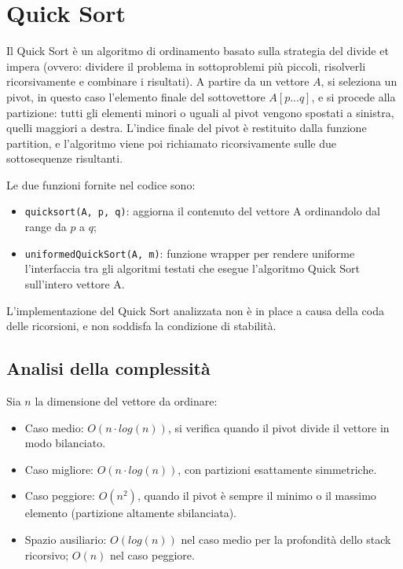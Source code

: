 \documentclass[a4paper, 12pt, oneside]{book}
\begin{document}



\chapter{Quick Sort}\label{chap:Quick Sort} %

Il Quick Sort è un algoritmo di ordinamento basato sulla strategia del divide et impera (ovvero: dividere il problema in sottoproblemi più piccoli, risolverli ricorsivamente e combinare i risultati).
A partire da un vettore \(A\), si seleziona un pivot, in questo caso l'elemento finale del sottovettore \(A[p...q]\), e si procede alla partizione: tutti gli elementi minori o uguali al pivot vengono spostati a sinistra, quelli maggiori a destra. L'indice finale del pivot è restituito dalla funzione partition, e l'algoritmo viene poi richiamato ricorsivamente sulle due sottosequenze risultanti.

\noindent Le due funzioni fornite nel codice sono:

\begin{itemize}
    \item \texttt{quicksort(A, p, q)}: aggiorna il contenuto del vettore A ordinandolo dal range da $p$ a $q$;
    \item \texttt{uniformedQuickSort(A, m)}: funzione wrapper per rendere uniforme l'interfaccia tra gli algoritmi testati che esegue l'algoritmo Quick Sort sull'intero vettore A.
\end{itemize}

\noindent
L'implementazione del Quick Sort analizzata non è in place a causa della coda delle ricorsioni, e non soddisfa la condizione di stabilità.

\section{Analisi della complessità}

Sia \(n\) la dimensione del vettore da ordinare:

\begin{itemize}
    \item Caso medio: \(O(n \cdot log(n))\), si verifica quando il pivot divide il vettore in modo bilanciato.
    \item Caso migliore: \(O(n \cdot log(n))\), con partizioni esattamente simmetriche.
    \item Caso peggiore: \(O(n^2)\), quando il pivot è sempre il minimo o il massimo elemento (partizione altamente sbilanciata).
    \item Spazio ausiliario: \(O(log(n))\) nel caso medio per la profondità dello stack ricorsivo; \(O(n)\) nel caso peggiore.
\end{itemize}
\end{document}
